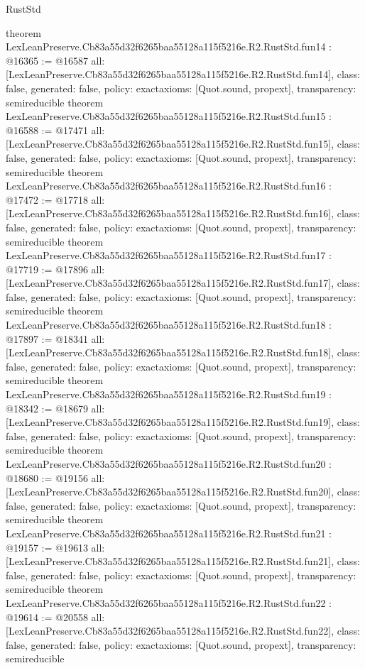 \begin{lexlean}{RustStd}
\begin{coremodule}
{}
theorem LexLeanPreserve.Cb83a55d32f6265baa55128a115f5216e.R2.RustStd.fun14 : @16365 := @16587 {
  all: [LexLeanPreserve.Cb83a55d32f6265baa55128a115f5216e.R2.RustStd.fun14],
  class: false,
  generated: false,
  policy: exact{axioms: [Quot.sound, propext]},
  transparency: semireducible
}
theorem LexLeanPreserve.Cb83a55d32f6265baa55128a115f5216e.R2.RustStd.fun15 : @16588 := @17471 {
  all: [LexLeanPreserve.Cb83a55d32f6265baa55128a115f5216e.R2.RustStd.fun15],
  class: false,
  generated: false,
  policy: exact{axioms: [Quot.sound, propext]},
  transparency: semireducible
}
theorem LexLeanPreserve.Cb83a55d32f6265baa55128a115f5216e.R2.RustStd.fun16 : @17472 := @17718 {
  all: [LexLeanPreserve.Cb83a55d32f6265baa55128a115f5216e.R2.RustStd.fun16],
  class: false,
  generated: false,
  policy: exact{axioms: [Quot.sound, propext]},
  transparency: semireducible
}
theorem LexLeanPreserve.Cb83a55d32f6265baa55128a115f5216e.R2.RustStd.fun17 : @17719 := @17896 {
  all: [LexLeanPreserve.Cb83a55d32f6265baa55128a115f5216e.R2.RustStd.fun17],
  class: false,
  generated: false,
  policy: exact{axioms: [Quot.sound, propext]},
  transparency: semireducible
}
theorem LexLeanPreserve.Cb83a55d32f6265baa55128a115f5216e.R2.RustStd.fun18 : @17897 := @18341 {
  all: [LexLeanPreserve.Cb83a55d32f6265baa55128a115f5216e.R2.RustStd.fun18],
  class: false,
  generated: false,
  policy: exact{axioms: [Quot.sound, propext]},
  transparency: semireducible
}
theorem LexLeanPreserve.Cb83a55d32f6265baa55128a115f5216e.R2.RustStd.fun19 : @18342 := @18679 {
  all: [LexLeanPreserve.Cb83a55d32f6265baa55128a115f5216e.R2.RustStd.fun19],
  class: false,
  generated: false,
  policy: exact{axioms: [Quot.sound, propext]},
  transparency: semireducible
}
theorem LexLeanPreserve.Cb83a55d32f6265baa55128a115f5216e.R2.RustStd.fun20 : @18680 := @19156 {
  all: [LexLeanPreserve.Cb83a55d32f6265baa55128a115f5216e.R2.RustStd.fun20],
  class: false,
  generated: false,
  policy: exact{axioms: [Quot.sound, propext]},
  transparency: semireducible
}
theorem LexLeanPreserve.Cb83a55d32f6265baa55128a115f5216e.R2.RustStd.fun21 : @19157 := @19613 {
  all: [LexLeanPreserve.Cb83a55d32f6265baa55128a115f5216e.R2.RustStd.fun21],
  class: false,
  generated: false,
  policy: exact{axioms: [Quot.sound, propext]},
  transparency: semireducible
}
theorem LexLeanPreserve.Cb83a55d32f6265baa55128a115f5216e.R2.RustStd.fun22 : @19614 := @20558 {
  all: [LexLeanPreserve.Cb83a55d32f6265baa55128a115f5216e.R2.RustStd.fun22],
  class: false,
  generated: false,
  policy: exact{axioms: [Quot.sound, propext]},
  transparency: semireducible
}
\end{coremodule}
\end{lexlean}
